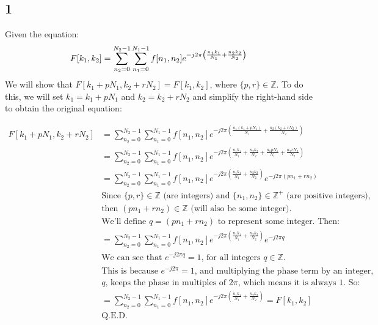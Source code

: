 \documentclass{article}
\begin{document}
\subsection*{1}
Given the equation:
\[
    F[k_{1}, k_{2}] = \sum_{n_{2} = 0}^{N_{2}-1} \sum_{n_{1} = 0}^{N_{1} - 1} f[n_{1}, n_{2}] \\
    e^{-j 2\pi\left(\frac{n_{1} k_{1}}{N_{1}} + \frac{n_{2} k_{2}}{N_{2}}\right)}
\]
We will show that $F[k_{1} + pN_{1}, k_{2} + rN_{2}] = F[k_{1}, k_{2}]$, where $\{p,r\} \in \mathbb{Z}$. To do this, we will
set $k_{1} = k_{1} + pN_{1}$ and $k_{2} = k_{2} + rN_{2}$ and simplify the right-hand side to
obtain the original equation:

\begin{align*}
    F[k_{1} + pN_{1}, k_{2} + rN_{2}] &= \sum_{n_{2} = 0}^{N_{2}-1} \sum_{n_{1} = 0}^{N_{1} - 1} f[n_{1}, n_{2}]
    e^{-j 2\pi\left(\frac{n_{1} (k_{1} + pN_{1})}{N_{1}} + \frac{n_{2} (k_{2} + rN_{2})}{N_{2}}\right)} \\
    &= \sum_{n_{2} = 0}^{N_{2}-1} \sum_{n_{1} = 0}^{N_{1} - 1} f[n_{1}, n_{2}]
    e^{-j 2\pi\left(\frac{n_{1} k_{1}}{N_{1}} + \frac{n_{2} k_{2}}{N_{2}} + \frac{n_{1} pN_{1}}{N_{1}} + \frac{n_{2} rN_{2}}{N_{2}} \right)} \\
    &= \sum_{n_{2} = 0}^{N_{2}-1} \sum_{n_{1} = 0}^{N_{1} - 1} f[n_{1}, n_{2}]
    e^{-j 2\pi\left(\frac{n_{1} k_{1}}{N_{1}} + \frac{n_{2} k_{2}}{N_{2}} \right)} e^{-j 2\pi \left(pn_{1} + rn_{2}\right)} \\
    &\textrm{Since $\{p,r\} \in \mathbb{Z}$ (are integers) and $\{n_{1}, n_{2}\} \in \mathbb{Z}^{+}$ (are positive integers),} \\
    &\textrm{then $\left(pn_{1} + rn_{2}\right) \in \mathbb{Z}$ (will also be some integer). } \\
    &\textrm{We'll define $q = \left(pn_{1} + rn_{2}\right)$ to represent some integer. Then: } \\
    &= \sum_{n_{2} = 0}^{N_{2}-1} \sum_{n_{1} = 0}^{N_{1} - 1} f[n_{1}, n_{2}]
    e^{-j 2\pi\left(\frac{n_{1} k_{1}}{N_{1}} + \frac{n_{2} k_{2}}{N_{2}} \right)} e^{-j 2\pi q} \\
    &\textrm{We can see that $e^{-j 2\pi q} = 1$, for all integers $q \in \mathbb{Z}$.} \\
    &\textrm{This is because $e^{-j 2\pi} = 1$, and multiplying the phase term by an integer,} \\
    &\textrm{$q$, keeps the phase in multiples of $2\pi$, which means it is always 1. So:} \\
    &= \sum_{n_{2} = 0}^{N_{2}-1} \sum_{n_{1} = 0}^{N_{1} - 1} f[n_{1}, n_{2}]
    e^{-j 2\pi\left(\frac{n_{1} k_{1}}{N_{1}} + \frac{n_{2} k_{2}}{N_{2}} \right)} = F[k_{1}, k_{2}] \\
    &\textrm{Q.E.D.}
\end{align*}
\end{document}
